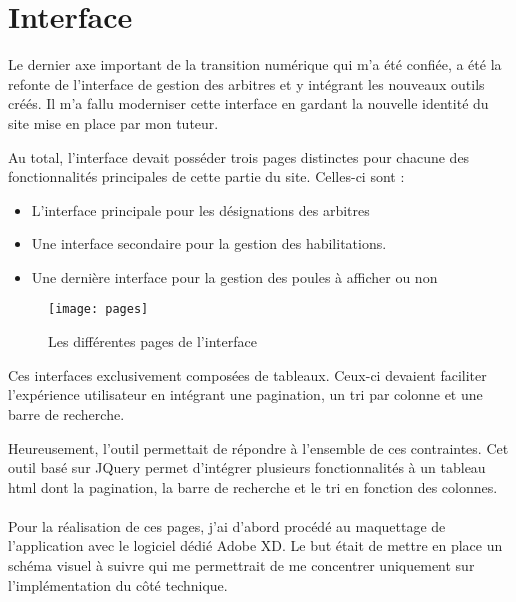 \section{Interface}
\vspace{1cm}


Le dernier axe important de la transition numérique qui m’a été confiée, a été la refonte de l’interface de gestion des arbitres et y intégrant les nouveaux outils créés. Il m’a fallu moderniser cette interface en gardant la nouvelle identité du site mise en place par mon tuteur.

Au total, l’interface devait posséder trois pages distinctes pour chacune des fonctionnalités principales de cette partie du site. Celles-ci sont :

\begin{itemize}
    \item L’interface principale pour les désignations des arbitres
    \item Une interface secondaire pour la gestion des habilitations.
    \item Une dernière interface pour la gestion des poules à afficher ou non
\end{itemize}

\vspace{1cm}

\begin{figure}[!h]
    \centering
    \texttt{[image: pages]}
    \caption{Les différentes pages de l'interface}
\end{figure}

\vspace{1cm}

Ces interfaces exclusivement composées de tableaux. Ceux-ci devaient faciliter l’expérience utilisateur en intégrant une pagination, un tri par colonne et une barre de recherche.

Heureusement, l’outil   permettait de répondre à l’ensemble de ces contraintes. 
Cet outil basé sur JQuery permet d’intégrer plusieurs fonctionnalités à un tableau html dont la pagination, la barre de recherche et le tri en fonction des colonnes.\\ \\

Pour la réalisation de ces pages, j’ai d’abord procédé au maquettage de l’application avec le logiciel dédié Adobe XD. Le but était de mettre en place un schéma visuel à suivre qui me permettrait de me concentrer uniquement sur l’implémentation du côté technique.

